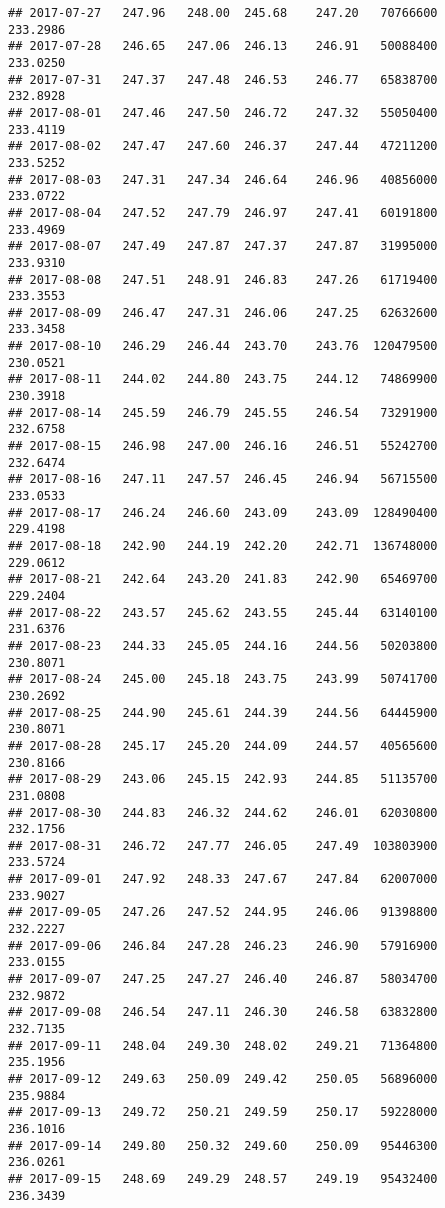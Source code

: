 \documentclass[
]{article}
\begin{document}
\begin{verbatim}
## 2017-07-27   247.96   248.00  245.68    247.20   70766600     233.2986
## 2017-07-28   246.65   247.06  246.13    246.91   50088400     233.0250
## 2017-07-31   247.37   247.48  246.53    246.77   65838700     232.8928
## 2017-08-01   247.46   247.50  246.72    247.32   55050400     233.4119
## 2017-08-02   247.47   247.60  246.37    247.44   47211200     233.5252
## 2017-08-03   247.31   247.34  246.64    246.96   40856000     233.0722
## 2017-08-04   247.52   247.79  246.97    247.41   60191800     233.4969
## 2017-08-07   247.49   247.87  247.37    247.87   31995000     233.9310
## 2017-08-08   247.51   248.91  246.83    247.26   61719400     233.3553
## 2017-08-09   246.47   247.31  246.06    247.25   62632600     233.3458
## 2017-08-10   246.29   246.44  243.70    243.76  120479500     230.0521
## 2017-08-11   244.02   244.80  243.75    244.12   74869900     230.3918
## 2017-08-14   245.59   246.79  245.55    246.54   73291900     232.6758
## 2017-08-15   246.98   247.00  246.16    246.51   55242700     232.6474
## 2017-08-16   247.11   247.57  246.45    246.94   56715500     233.0533
## 2017-08-17   246.24   246.60  243.09    243.09  128490400     229.4198
## 2017-08-18   242.90   244.19  242.20    242.71  136748000     229.0612
## 2017-08-21   242.64   243.20  241.83    242.90   65469700     229.2404
## 2017-08-22   243.57   245.62  243.55    245.44   63140100     231.6376
## 2017-08-23   244.33   245.05  244.16    244.56   50203800     230.8071
## 2017-08-24   245.00   245.18  243.75    243.99   50741700     230.2692
## 2017-08-25   244.90   245.61  244.39    244.56   64445900     230.8071
## 2017-08-28   245.17   245.20  244.09    244.57   40565600     230.8166
## 2017-08-29   243.06   245.15  242.93    244.85   51135700     231.0808
## 2017-08-30   244.83   246.32  244.62    246.01   62030800     232.1756
## 2017-08-31   246.72   247.77  246.05    247.49  103803900     233.5724
## 2017-09-01   247.92   248.33  247.67    247.84   62007000     233.9027
## 2017-09-05   247.26   247.52  244.95    246.06   91398800     232.2227
## 2017-09-06   246.84   247.28  246.23    246.90   57916900     233.0155
## 2017-09-07   247.25   247.27  246.40    246.87   58034700     232.9872
## 2017-09-08   246.54   247.11  246.30    246.58   63832800     232.7135
## 2017-09-11   248.04   249.30  248.02    249.21   71364800     235.1956
## 2017-09-12   249.63   250.09  249.42    250.05   56896000     235.9884
## 2017-09-13   249.72   250.21  249.59    250.17   59228000     236.1016
## 2017-09-14   249.80   250.32  249.60    250.09   95446300     236.0261
## 2017-09-15   248.69   249.29  248.57    249.19   95432400     236.3439

\end{verbatim}
\end{document}

